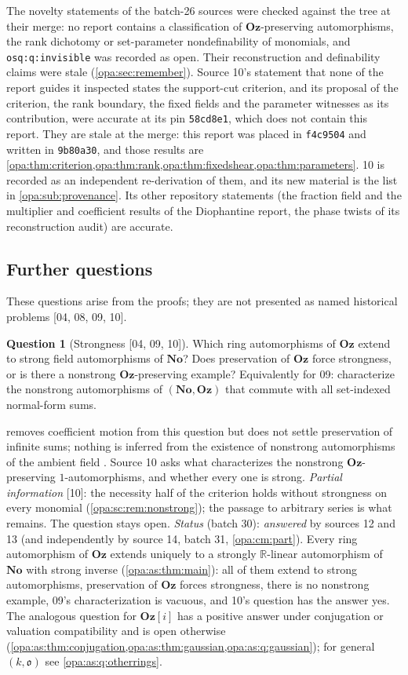 \documentclass[11pt,oneside]{article}
\numberwithin{equation}{section}
\theoremstyle{definition}
\newtheorem{question}[question]{Question}
\theoremstyle{remark}
\newcommand{\No}{\mathbf{No}}
\newcommand{\Oz}{\mathbf{Oz}}
\newcommand{\Og}{\mathbf{Oz}[i]}
\newcommand{\R}{\mathbb R}
\newcommand{\oo}{\mathfrak o}
\newcommand{\src}[1]{\textup{\textsf{\small[#1]}}}
\newcommand{\lbl}[1]{\nolinkurl{#1}}
\begin{document}
The novelty statements of the batch-26 sources were checked against the
tree at their merge: no report contains a classification of $\Oz$-preserving
automorphisms, the rank dichotomy or set-parameter nondefinability of
monomials, and \lbl{osq:q:invisible} was recorded as open. Their
reconstruction and definability claims were stale (\cref{opa:sec:remember}).
Source 10's statement that none of the report guides it inspected states the
support-cut criterion, and its proposal of the criterion, the rank boundary,
the fixed fields and the parameter witnesses as its contribution, were
accurate at its pin \texttt{58cd8e1}, which does not contain this report. They
are stale at the merge: this report was placed in \texttt{f4c9504} and written
in \texttt{9b80a30}, and those results are
\cref{opa:thm:criterion,opa:thm:rank,opa:thm:fixedshear,opa:thm:parameters}.
10 is recorded as an independent re-derivation of them, and its new material
is the list in \cref{opa:sub:provenance}. Its other repository statements
(the fraction field and the multiplier and coefficient results of the
Diophantine report, the phase twists of its reconstruction audit) are accurate.

\subsection{Further questions}\label{opa:sub:questions}

These questions arise from the proofs; they are not presented as named historical
problems \src{04, 08, 09, 10}.

\begin{question}[Strongness \src{04, 09, 10}]\label{opa:q:strong}
Which ring automorphisms of $\Oz$ extend to strong field automorphisms of $\No$?
Does preservation of $\Oz$ force strongness, or is there a nonstrong
$\Oz$-preserving example? Equivalently for 09: characterize the nonstrong
automorphisms of $(\No,\Oz)$ that commute with all set-indexed normal-form sums.
\end{question}
 removes coefficient motion from this question but does not
settle preservation of infinite sums; nothing is inferred from the existence of
nonstrong automorphisms of the ambient field \cite{KKS}. Source 10 asks what
characterizes the nonstrong $\Oz$-preserving $1$-automorphisms, and whether every
one is strong. \emph{Partial information} \src{10}: the necessity half of the
criterion holds without strongness on every monomial
(\cref{opa:sc:rem:nonstrong}); the passage to arbitrary series is what remains.
The question stays open. \emph{Status} (batch 30): \emph{answered} by sources 12
and 13 (and independently by source 14, batch 31, \cref{opa:cm:part}). Every ring automorphism of $\Oz$ extends uniquely to a strongly
$\R$-linear automorphism of $\No$ with strong inverse (\cref{opa:as:thm:main}):
all of them extend to strong automorphisms, preservation of $\Oz$ forces
strongness, there is no nonstrong example, 09's characterization is vacuous, and
10's question has the answer yes. The analogous question for $\Og$ has a
positive answer under conjugation or valuation compatibility and is open otherwise
(\cref{opa:as:thm:conjugation,opa:as:thm:gaussian,opa:as:q:gaussian}); for general
$(k,\oo)$ see \cref{opa:as:q:otherrings}.
\end{document}
